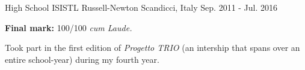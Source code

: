 \begin{cventries}
\cventry
{High School} %
{ISISTL Russell-Newton} %
{Scandicci, Italy} %
{Sep. 2011 - Jul. 2016} %
{
    \begin{cvitems}
        \item{\textbf{Final mark:} 100/100 \textit{cum Laude.}}
        \item{Took part in the first edition of \textit{Progetto TRIO} (an intership that spans over an entire school-year) during my fourth year.}
    \end{cvitems}
}

\end{cventries}
